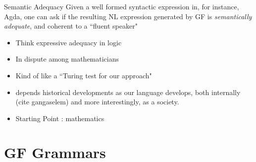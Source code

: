\documentclass[10pt]{beamer}
\begin{document}
\begin{frame}

\begin{block}{Semantic Adequacy}
  Given a well formed syntactic expression in, for instance, Agda, one
can ask if the resulting NL expression generated by GF is
\emph{semantically adequate}, and coherent to a ``fluent speaker"

\end{block}

\begin{itemize}
  \item Think expressive adequacy in logic
  \item In dispute among mathematicians
  \item Kind of like a ``Turing test for our approach" %
  \item depends historical developments as our language develops, both
    internally (cite gangaselem) and more interestingly, as a society.
  \item Starting Point : \cite{real} mathematics

\end{itemize}


\end{frame}

\section{GF Grammars}

\begin{frame}[fragile]
\centering
{}
\end{frame}
\end{document}
